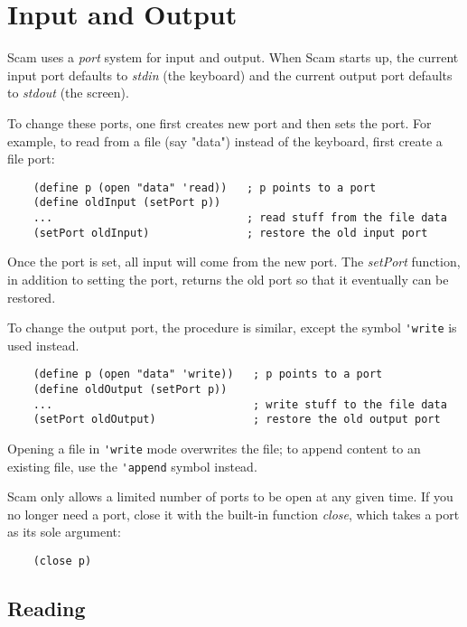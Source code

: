 \chapter{Input and Output}
\label{InputAndOutput}

Scam uses a {\it port} system for input and output.
When Scam starts up, the current input port defaults to
{\it stdin} (the keyboard) and the current output
port defaults to {\it stdout} (the screen).

To change these ports, one first creates new port
and then sets the port.
For example, to read from a file (say "data")
instead of the keyboard,
first create a file port:

\begin{verbatim}
    (define p (open "data" 'read))   ; p points to a port
    (define oldInput (setPort p))
    ...                              ; read stuff from the file data
    (setPort oldInput)               ; restore the old input port
\end{verbatim}

Once the port is set, all input will come from the new port.
The {\it setPort} function, in addition to setting the port, returns
the old port so that it eventually can be restored.

To change the output port, the procedure is similar, except
the symbol \verb!'write! is used instead.

\begin{verbatim}
    (define p (open "data" 'write))   ; p points to a port
    (define oldOutput (setPort p))
    ...                               ; write stuff to the file data
    (setPort oldOutput)               ; restore the old output port
\end{verbatim}

Opening a file in \verb!'write! mode overwrites the file;
to append content to an existing file, use the \verb!'append!
symbol instead.

Scam only allows a limited number of ports to be open at
any given time. If you no longer need a port, close it with
the built-in function {\it close}, which takes a port as its
sole argument:

\begin{verbatim}
    (close p)
\end{verbatim}

\section{Reading}


